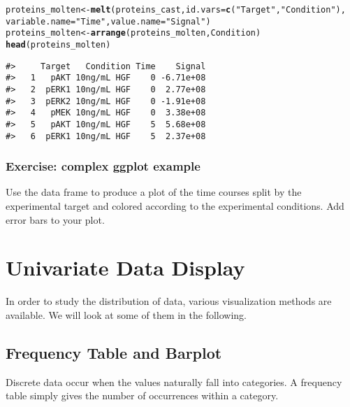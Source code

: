 \documentclass{article}\usepackage[]{graphicx}\usepackage[usenames,dvipsnames]{color}
\makeatletter
\newcommand{\hlstr}[1]{\textcolor[rgb]{0.192,0.494,0.8}{#1}}%
\newcommand{\hlstd}[1]{\textcolor[rgb]{0.345,0.345,0.345}{#1}}%
\newcommand{\hlkwb}[1]{\textcolor[rgb]{0.69,0.353,0.396}{#1}}%
\newcommand{\hlkwc}[1]{\textcolor[rgb]{0.333,0.667,0.333}{#1}}%
\newcommand{\hlkwd}[1]{\textcolor[rgb]{0.737,0.353,0.396}{\textbf{#1}}}%
\newenvironment{kframe}{%
 \def\at@end@of@kframe{}%
 \ifinner\ifhmode%
  \def\at@end@of@kframe{\end{minipage}}%
  \begin{minipage}{\columnwidth}%
 \fi\fi%
 \def\FrameCommand##1{\hskip\@totalleftmargin \hskip-\fboxsep
 \colorbox{shadecolor}{##1}\hskip-\fboxsep
     \hskip-\linewidth \hskip-\@totalleftmargin \hskip\columnwidth}%
 \MakeFramed {\advance\hsize-\width
   \@totalleftmargin\z@ \linewidth\hsize
   \@setminipage}}%
 {\par\unskip\endMakeFramed%
 \at@end@of@kframe}
\newenvironment{knitrout}{}{} %
\makeatother
\begin{document}
\begin{knitrout}
\color{fgcolor}\begin{kframe}
\begin{alltt}
\hlstd{proteins_molten} \hlkwb{<-} \hlkwd{melt}\hlstd{(proteins_cast,} \hlkwc{id.vars} \hlstd{=} \hlkwd{c}\hlstd{(}\hlstr{"Target"}\hlstd{,} \hlstr{"Condition"}\hlstd{),}
\hlkwc{variable.name}\hlstd{=}\hlstr{"Time"}\hlstd{,} \hlkwc{value.name}\hlstd{=} \hlstr{"Signal"}\hlstd{)}
\hlstd{proteins_molten} \hlkwb{<-}\hlkwd{arrange}\hlstd{(proteins_molten, Condition)}
\hlkwd{head}\hlstd{(proteins_molten)}
\end{alltt}
\begin{verbatim}
#>     Target   Condition Time    Signal
#>   1   pAKT 10ng/mL HGF    0 -6.71e+08
#>   2  pERK1 10ng/mL HGF    0  2.77e+08
#>   3  pERK2 10ng/mL HGF    0 -1.91e+08
#>   4   pMEK 10ng/mL HGF    0  3.38e+08
#>   5   pAKT 10ng/mL HGF    5  5.68e+08
#>   6  pERK1 10ng/mL HGF    5  2.37e+08
\end{verbatim}
\end{kframe}
\end{knitrout}

\subsubsection*{Exercise: complex ggplot example}
 
Use the data frame  to produce 
a plot of the time courses  split by the experimental 
target and colored according to the experimental 
conditions. Add error bars to your plot.






\section{Univariate Data Display}

In order to study the distribution of data, various visualization methods are 
available. We will look at some of them in the following.

\subsection{Frequency Table and Barplot}

Discrete data occur when the values naturally fall into categories. A frequency 
table simply gives the number of occurrences within a category.
\end{document}
